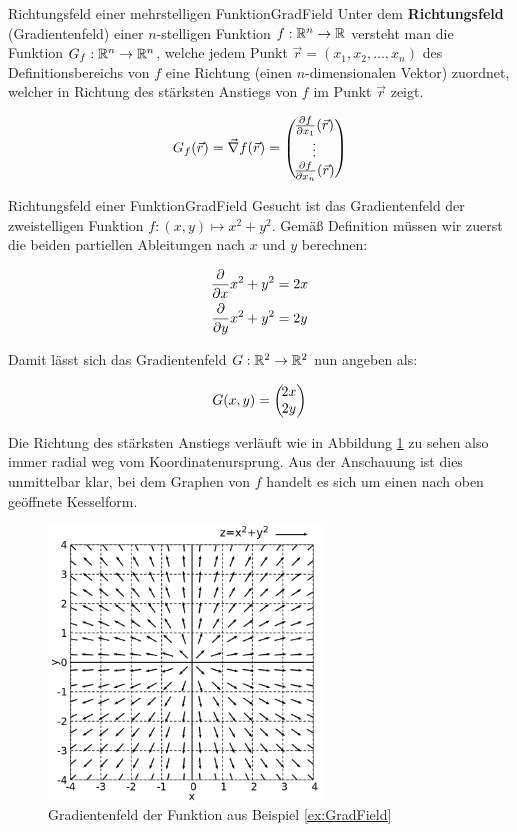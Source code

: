 \begin{definition}{Richtungsfeld einer mehrstelligen Funktion}{GradField}
    Unter dem \textbf{Richtungsfeld} (Gradientenfeld) einer $n$-stelligen Funktion $f: \mathbb{R}^n \to  \mathbb{R}$ versteht man die Funktion $G_f: \mathbb{R}^n \to \mathbb{R}^n$, welche jedem Punkt $\vec{r}=(x_1,x_2,...,x_n)$ des Definitionsbereichs von $f$ eine Richtung (einen $n$-dimensionalen Vektor) zuordnet, welcher in Richtung des stärksten Anstiegs von $f$ im Punkt $\vec{r}$ zeigt.

    $$
        G_f(\vec{r}) = \vec\nabla f(\vec{r}) = \left(\negthinspace\begin{matrix}\frac{\partial f}{\partial x_1}(\vec{r})\\\vdots\\\frac{\partial f}{\partial x_n}(\vec{r})\end{matrix}\right)
    $$
\end{definition}

\begin{example}{Richtungsfeld einer Funktion}{GradField}
    Gesucht ist das Gradientenfeld der zweistelligen Funktion $f: (x,y) \mapsto x^2+y^2$. Gemäß Definition müssen wir zuerst die beiden partiellen Ableitungen nach $x$ und $y$ berechnen:

    \begin{alignat*}{1}
        \frac{\partial }{\partial x} x^2+y^2 &= 2x \\
        \frac{\partial }{\partial y} x^2+y^2 &= 2y
    \end{alignat*}

    Damit lässt sich das Gradientenfeld $G: \mathbb{R}^2 \to \mathbb{R}^2$ nun angeben als:

    $$
        G(x,y) = \left(\negthinspace\begin{matrix}2x\\2y\end{matrix}\right)
    $$

    Die Richtung des stärksten Anstiegs verläuft wie in Abbildung \ref{fig:ExGradField} zu sehen also immer radial weg vom Koordinatenursprung. Aus der Anschauung ist dies unmittelbar klar, bei dem Graphen von $f$ handelt es sich um einen nach oben geöffnete Kesselform.
\end{example}

\begin{figure}
    \centering
    \includegraphics[width=0.65\textwidth]{./gnuplot/example-gradient-field}
    \caption{Gradientenfeld der Funktion aus Beispiel \ref{ex:GradField}}
    \label{fig:ExGradField}
\end{figure}


